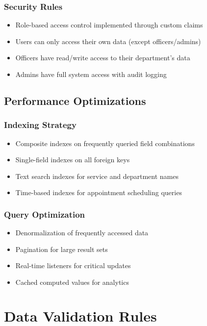\documentclass[12pt,a4paper]{article}
\begin{document}
\subsubsection{Security Rules}
\begin{itemize}[leftmargin=*]
    \item Role-based access control implemented through custom claims
    \item Users can only access their own data (except officers/admins)
    \item Officers have read/write access to their department's data
    \item Admins have full system access with audit logging
\end{itemize}

\subsection{Performance Optimizations}

\subsubsection{Indexing Strategy}
\begin{itemize}[leftmargin=*]
    \item Composite indexes on frequently queried field combinations
    \item Single-field indexes on all foreign keys
    \item Text search indexes for service and department names
    \item Time-based indexes for appointment scheduling queries
\end{itemize}

\subsubsection{Query Optimization}
\begin{itemize}[leftmargin=*]
    \item Denormalization of frequently accessed data
    \item Pagination for large result sets
    \item Real-time listeners for critical updates
    \item Cached computed values for analytics
\end{itemize}

\section{Data Validation Rules}
\end{document}
